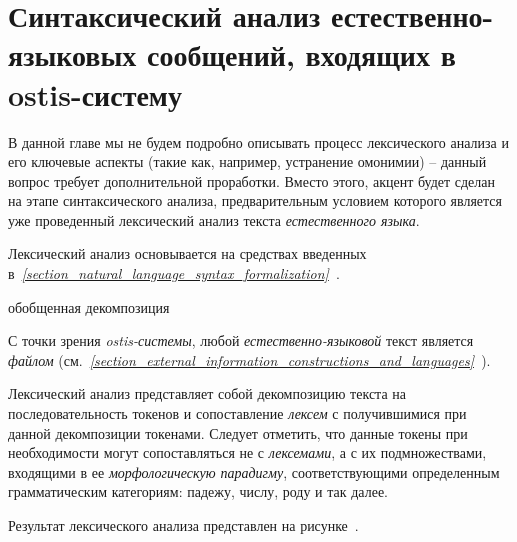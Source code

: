 \section{Синтаксический анализ естественно-языковых сообщений, входящих в ostis-систему}
\label{section_natural_language_messages_syntax_analysis}

В данной главе мы не будем подробно описывать процесс лексического анализа и его ключевые аспекты (такие как, например, устранение омонимии) – данный вопрос требует дополнительной проработки.
Вместо этого, акцент будет сделан на этапе синтаксического анализа, предварительным условием которого является уже проведенный лексический анализ текста \textit{естественного языка}.

Лексический анализ основывается на средствах введенных в~\textit{\ref{section_natural_language_syntax_formalization}~}.

\begin{SCn}

    \begin{scnrelfromset}{обобщенная декомпозиция}
    \end{scnrelfromset}

\end{SCn}

С точки зрения \textit{ostis-системы}, любой \textit{естественно-языковой} текст является \textit{файлом} (см.~\textit{\ref{section_external_information_constructions_and_languages}~}).

Лексический анализ представляет собой декомпозицию текста на последовательность токенов и сопоставление \textit{лексем} с получившимися при данной декомпозиции токенами.
Следует отметить, что данные токены при необходимости могут сопоставляться не с \textit{лексемами}, а с их подмножествами, входящими в ее \textit{морфологическую парадигму}, соответствующими определенным грамматическим категориям: падежу, числу, роду и так далее.

Результат лексического анализа представлен на рисунке~\textit{}.

